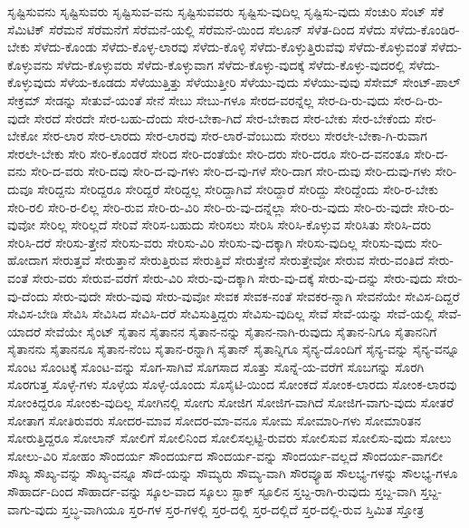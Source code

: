 {ಸೃಷ್ಟಿಸುವನು
ಸೃಷ್ಟಿಸುವರು
ಸೃಷ್ಟಿಸುವ-ವನು
ಸೃಷ್ಟಿಸುವವರು
ಸೃಷ್ಟಿಸು-ವುದಿಲ್ಲ
ಸೃಷ್ಟಿಸು-ವುದು
ಸೆಂಚುರಿ
ಸೆಂಟ್
ಸೆಕೆ
ಸೆಮಿಟಿಕ್
ಸೆರೆಮನೆ
ಸೆರೆಮನೆಗೆ
ಸೆರೆಮನೆ-ಯಲ್ಲಿ
ಸೆರೆಮನೆ-ಯಿಂದ
ಸೆಲೂನ್
ಸೆಳೆತ-ದಿಂದ
ಸೆಳೆದು
ಸೆಳೆದು-ಕೊಂಡಿರ-ಬೇಕು
ಸೆಳೆದು-ಕೊಂಡು
ಸೆಳೆದು-ಕೊಳ್ಳ-ಲಾರವು
ಸೆಳೆದು-ಕೊಳ್ಳಿ
ಸೆಳೆದು-ಕೊಳ್ಳುತ್ತಿರುವೆವು
ಸೆಳೆದು-ಕೊಳ್ಳುವಂತೆ
ಸೆಳೆದು-ಕೊಳ್ಳುವನು
ಸೆಳೆದು-ಕೊಳ್ಳುವರು
ಸೆಳೆದು-ಕೊಳ್ಳುವಾಗ
ಸೆಳೆದು-ಕೊಳ್ಳು-ವುದಕ್ಕೆ
ಸೆಳೆದು-ಕೊಳ್ಳು-ವುದರಲ್ಲಿ
ಸೆಳೆದು-ಕೊಳ್ಳುವುದು
ಸೆಳೆಯ-ಕೂಡದು
ಸೆಳೆಯುತ್ತಿತ್ತು
ಸೆಳೆಯುತ್ತೀರಿ
ಸೆಳೆಯು-ವುದು
ಸೆಳೆಯು-ವುವು
ಸೆಸೇಮ್
ಸೇಂಟ್-ಪಾಲ್
ಸೇಕ್ರಮ್
ಸೇಡನ್ನು
ಸೇತುವೆ-ಯಂತೆ
ಸೇನೆ
ಸೇಬು
ಸೇಬು-ಗಳೂ
ಸೇರದ-ವರನ್ನೆಲ್ಲ
ಸೇರ-ದಿ-ರು-ವುದು
ಸೇರ-ದಿ-ರು-ವುದೇ
ಸೇರದೆ
ಸೇರದೇ
ಸೇರ-ಬಹು-ದೆಂದು
ಸೇರ-ಬೇಕಾ-ಗಿದೆ
ಸೇರ-ಬೇಕಾದ
ಸೇರ-ಬೇಕು
ಸೇರ-ಬೇಕೆಂದು
ಸೇರ-ಬೇಕೋ
ಸೇರ-ಲಾರ
ಸೇರ-ಲಾರದು
ಸೇರ-ಲಾರವು
ಸೇರ-ಲಾರೆ-ವೆಂಬುದು
ಸೇರಲು
ಸೇರಲೇ-ಬೇಕಾ-ಗಿ-ರುವಾಗ
ಸೇರಲೇ-ಬೇಕು
ಸೇರಿ
ಸೇರಿ-ಕೊಂಡರೆ
ಸೇರಿದ
ಸೇರಿ-ದಂತೆಯೇ
ಸೇರಿ-ದರು
ಸೇರಿ-ದರೂ
ಸೇರಿ-ದ-ವನಂತೂ
ಸೇರಿ-ದ-ವನು
ಸೇರಿ-ದ-ವರು
ಸೇರಿ-ದವು
ಸೇರಿ-ದ-ವು-ಗಳು
ಸೇರಿ-ದ-ವು-ಗಳೆ
ಸೇರಿ-ದಾಗ
ಸೇರಿ-ದುವು
ಸೇರಿ-ದುವು-ಗಳು
ಸೇರಿ-ದುವೂ
ಸೇರಿದ್ದನು
ಸೇರಿದ್ದರೂ
ಸೇರಿದ್ದರೆ
ಸೇರಿದ್ದಲ್ಲ
ಸೇರಿದ್ದಾಗಿವೆ
ಸೇರಿದ್ದಾರೆ
ಸೇರಿದ್ದು
ಸೇರಿದ್ದೆಂದು
ಸೇರಿ-ರ-ಬೇಕು
ಸೇರಿ-ರಲಿ
ಸೇರಿ-ರ-ಲಿಲ್ಲ
ಸೇರಿ-ರುವ
ಸೇರಿ-ರು-ವಿರಿ
ಸೇರಿ-ರು-ವು-ದನ್ನೆಲ್ಲಾ
ಸೇರಿ-ರು-ವುದು
ಸೇರಿ-ರು-ವುದೇ
ಸೇರಿ-ರು-ವುವೋ
ಸೇರಿಲ್ಲ
ಸೇರಿಲ್ಲದೆ
ಸೇರಿವೆ
ಸೇರಿಸ-ಬಹುದು
ಸೇರಿಸಲು
ಸೇರಿಸಿ
ಸೇರಿಸಿ-ಕೊಳ್ಳುವ
ಸೇರಿಸಿತು
ಸೇರಿಸಿ-ದರು
ಸೇರಿಸಿ-ದರೆ
ಸೇರಿಸು-ತ್ತೇನೆ
ಸೇರಿಸು-ವರು
ಸೇರಿಸು-ವಿರಿ
ಸೇರಿಸು-ವು-ದಕ್ಕಾಗಿ
ಸೇರಿಸು-ವುದಿಲ್ಲ
ಸೇರಿಸು-ವುದು
ಸೇರಿ-ಹೋದಾಗ
ಸೇರುತ್ತವೆ
ಸೇರುತ್ತಾನೆ
ಸೇರುತ್ತಿರುವ
ಸೇರುತ್ತಿವೆ
ಸೇರುತ್ತೇನೆ
ಸೇರುತ್ತೇವೋ
ಸೇರುವ
ಸೇರು-ವಂತಿದೆ
ಸೇರು-ವಂತೆ
ಸೇರು-ವರು
ಸೇರುವ-ವರೆಗೆ
ಸೇರು-ವಿರಿ
ಸೇರು-ವು-ದಕ್ಕಾಗಿ
ಸೇರು-ವು-ದಕ್ಕೆ
ಸೇರು-ವು-ದನ್ನು
ಸೇರು-ವುದು
ಸೇರು-ವು-ದೆಂದು
ಸೇರು-ವುದೇ
ಸೇರು-ವುವು
ಸೇರು-ವುವೋ
ಸೇವಕ
ಸೇವಕ-ನಂತೆ
ಸೇವಕರ-ನ್ನಾಗಿ
ಸೇವನೆಯೇ
ಸೇವಿಸ-ದಿದ್ದರೆ
ಸೇವಿಸ-ಬೇಡಿ
ಸೇವಿಸಿ
ಸೇವಿಸಿದ
ಸೇವಿಸಿ-ದರೆ
ಸೇವಿಸುತ್ತಿದ್ದರು
ಸೇವಿಸು-ವುದಿಲ್ಲ
ಸೇವೆ
ಸೇವೆ-ಯನ್ನು
ಸೇವೆ-ಯಲ್ಲಿ
ಸೇವೆ-ಯಾದರೆ
ಸೇವೆಯೇ
ಸೈಂಟ್
ಸೈತಾನ
ಸೈತಾನನ
ಸೈತಾನ-ನನ್ನು
ಸೈತಾನ-ನಾಗಿ-ರುವುದು
ಸೈತಾನ-ನಿಗೂ
ಸೈತಾನನಿಗೆ
ಸೈತಾನನು
ಸೈತಾನನೂ
ಸೈತಾನ-ನೆಂಬ
ಸೈತಾನ-ರನ್ನಾಗಿ
ಸೈತಾನ್
ಸೈತಾನ್ನಿಗೂ
ಸೈನ್ಯ-ದೊಂದಿಗೆ
ಸೈನ್ಯ-ವನ್ನು
ಸೈನ್ಯ-ವನ್ನೂ
ಸೊಂಟ
ಸೊಂಟಕ್ಕೆ
ಸೊಂಟ-ವನ್ನು
ಸೊಗ-ಸಾಗಿವೆ
ಸೊಗಸಾದ
ಸೊತ್ತು
ಸೊನ್ನೆ-ಯ-ವರೆಗೆ
ಸೊಬಗನ್ನು
ಸೊರಗಿ
ಸೊರಗುತ್ತ
ಸೊಳ್ಳೆ-ಗಳು
ಸೊಳ್ಳೆಯ
ಸೊಳ್ಳೆ-ಯೊಂದು
ಸೊಸೈಟಿ-ಯಿಂದ
ಸೋಂಕದೆ
ಸೋಂಕ-ಲಾರದು
ಸೋಂಕ-ಲಾರವು
ಸೋಂಕಿದ್ದರೂ
ಸೋಂಕು-ವುದಿಲ್ಲ
ಸೋಗಿನಲ್ಲಿ
ಸೋಗು
ಸೋಜಿಗ
ಸೋಜಿಗ-ವಾಗಿದೆ
ಸೋಜಿಗ-ವಾಗು-ವುದು
ಸೋತರೆ
ಸೋತಾಗ
ಸೋತಿರುವರು
ಸೋದರ-ಮಾವ
ಸೋದರ-ಮಾ-ವನೂ
ಸೋಮ
ಸೋಮಾರಿ-ಗಳು
ಸೋಮಾರಿತನ
ಸೋರುತ್ತಿದ್ದರೂ
ಸೋಲಾನ್
ಸೋಲಿಗೆ
ಸೋಲಿನಿಂದ
ಸೋಲಿಸಲ್ಪಟ್ಟಿ-ರುವರು
ಸೋಲಿಸುವ
ಸೋಲಿಸು-ವುದು
ಸೋಲು
ಸೋಲು-ವಿರಿ
ಸೋಹಂ
ಸೌಂದರ್ಯ
ಸೌಂದರ್ಯದ
ಸೌಂದರ್ಯ-ವನ್ನು
ಸೌಂದರ್ಯ-ವಲ್ಲದೆ
ಸೌಂದರ್ಯ-ವಾಗಲೀ
ಸೌಖ್ಯ
ಸೌಖ್ಯ-ವನ್ನು
ಸೌಖ್ಯ-ವನ್ನೂ
ಸೌದೆ-ಯನ್ನು
ಸೌಮ್ಯರು
ಸೌಮ್ಯ-ವಾಗಿ
ಸೌರವ್ಯೂಹ
ಸೌಲಭ್ಯ-ಗಳನ್ನು
ಸೌಲಭ್ಯ-ಗಳೂ
ಸೌಹಾರ್ದ-ದಿಂದ
ಸೌಹಾರ್ದ-ವನ್ನು
ಸ್ಕೂಲ-ವಾದ
ಸ್ಕೂಲು
ಸ್ಟಾಕ್
ಸ್ಟೂಲಿನ
ಸ್ತಬ್ದ-ರಾಗಿ-ರುವುದು
ಸ್ತಬ್ದ-ವಾಗಿ
ಸ್ತಬ್ದ-ವಾಗು-ವುದು
ಸ್ತಬ್ಧ-ವಾಗಿಯೂ
ಸ್ತರ-ಗಳ
ಸ್ತರ-ಗಳಲ್ಲಿ
ಸ್ತರ-ದಲ್ಲಿ
ಸ್ತರ-ದಲ್ಲಿದೆ
ಸ್ತರ-ದಲ್ಲಿ-ರುವ
ಸ್ತಿಮಿತ
ಸ್ತೋತ್ರ
}
